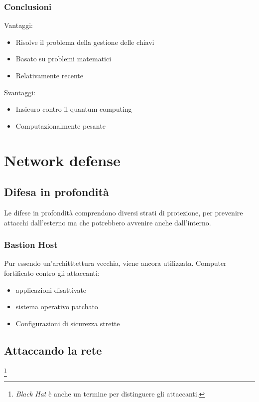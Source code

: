 \subsubsection{Conclusioni}

Vantaggi:
\begin{itemize}
\item Risolve il problema della gestione delle chiavi
\item Basato su problemi matematici
\item Relativamente recente
\end{itemize}

Svantaggi:
\begin{itemize}
\item Insicuro contro il quantum computing
\item Computazionalmente pesante
\end{itemize}


\section{Network defense}

\subsection{Difesa in profondità}

Le difese in profondità comprendono diversi strati di protezione, per prevenire
attacchi dall'esterno ma che potrebbero avvenire anche dall'interno.

\subsubsection{Bastion Host}

Pur essendo un'architttettura vecchia, viene ancora utilizzata.
Computer fortificato contro gli attaccanti:
\begin{itemize}
\item applicazioni disattivate
\item sistema operativo patchato
\item Configurazioni di sicurezza strette
\end{itemize}

\subsection{Attaccando la rete}\footnote{\textit{Black Hat} è anche un termine
per distinguere gli attaccanti.}

